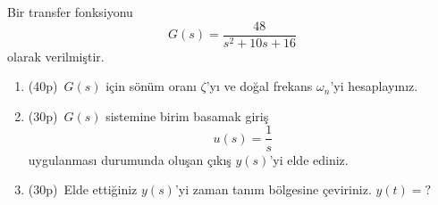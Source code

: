 Bir transfer fonksiyonu
\begin{equation}
    G(s)=\frac{48}{s^2+10s+16}
\end{equation}
olarak verilmiştir.
\begin{enumerate}
    \item(40p)\, $G(s)$ için sönüm oranı $\zeta$'yı ve doğal frekans $\omega_n$'yi hesaplayınız.
    \item(30p)\, $G(s)$ sistemine birim basamak giriş
    \begin{equation}
        u(s)=\frac{1}{s}
    \end{equation}
    uygulanması durumunda oluşan çıkış $y(s)$'yi elde ediniz.
    \item(30p)\, Elde ettiğiniz $y(s)$'yi zaman tanım bölgesine çeviriniz. $y(t)=?$
\end{enumerate}